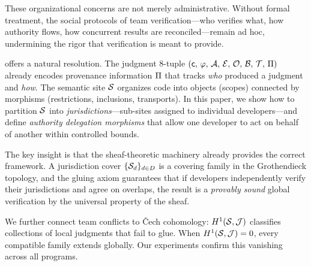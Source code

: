 \documentclass[11pt]{article}
\begin{document}
These organizational concerns are not merely administrative. Without formal
treatment, the social protocols of team verification---who verifies what, how
authority flows, how concurrent results are reconciled---remain ad hoc,
undermining the rigor that verification is meant to provide.

\JuGeo{} offers a natural resolution. The judgment 8-tuple
$(\mathsf{c},\,\varphi,\,\mathcal{A},\,\mathcal{E},\,\mathcal{O},\,\mathcal{B},\,\mathcal{T},\,\Pi)$ already
encodes provenance information $\Pi$ that tracks \emph{who} produced a
judgment and \emph{how}. The semantic site $\mathcal{S}$ organizes code into objects
(scopes) connected by morphisms (restrictions, inclusions, transports). In this
paper, we show how to partition $\mathcal{S}$ into \emph{jurisdictions}---sub-sites
assigned to individual developers---and define \emph{authority delegation
morphisms} that allow one developer to act on behalf of another within
controlled bounds.

The key insight is that the sheaf-theoretic machinery already provides the
correct framework. A jurisdiction cover
$\{\mathcal{S}_d\}_{d \in D}$ is a covering family in the Grothendieck topology, and
the gluing axiom guarantees that if developers independently verify their
jurisdictions and agree on overlaps, the result is a \emph{provably sound}
global verification by the universal property of the sheaf.

We further connect team conflicts to \v{C}ech cohomology:
$H^{1}(\mathcal{S}, \mathcal{J})$ classifies collections of local judgments that fail to
glue. When $H^{1}(\mathcal{S}, \mathcal{J}) = 0$, every compatible family extends globally.
Our experiments confirm this vanishing across all \expHOneZero{} programs.
\end{document}
